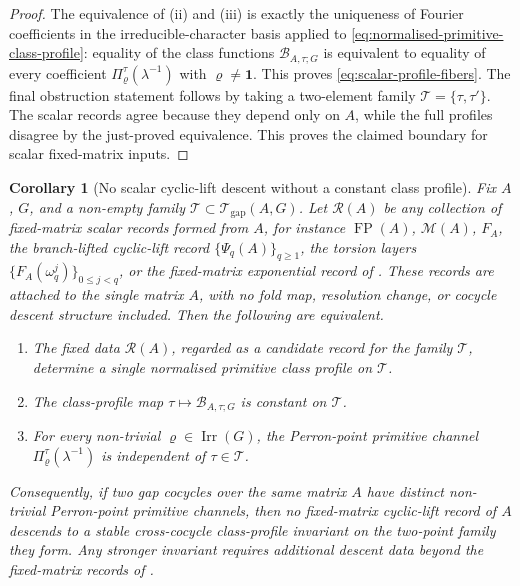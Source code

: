 \documentclass[11pt,a4paper]{amsart}
\theoremstyle{plain}
\newtheorem{corollary}[theorem]{Corollary}
\theoremstyle{definition}
\theoremstyle{remark}
\DeclareMathOperator{\Irr}{Irr}
\DeclareMathOperator{\FP}{FP}
\begin{document}
\begin{proof}
  The equivalence of \textup{(ii)} and \textup{(iii)} is exactly the
  uniqueness of Fourier coefficients in the irreducible-character basis
  applied to
  \eqref{eq:normalised-primitive-class-profile}: equality of the class
  functions \(\mathcal B_{A,\tau;G}\) is equivalent to equality of every
  coefficient \(\Pi_\varrho^\tau(\lambda^{-1})\) with
  \(\varrho\neq\mathbf 1\). This proves
  \eqref{eq:scalar-profile-fibers}. The final obstruction statement follows by
  taking a two-element family \(\mathscr T=\{\tau,\tau'\}\). The scalar
  records agree because they depend only on \(A\), while the full
  profiles disagree by the just-proved equivalence. This proves the
  claimed boundary for scalar fixed-matrix inputs.
\end{proof}

\begin{corollary}[No scalar cyclic-lift descent without a constant
  class profile]
  \label{cor:fixed-matrix-record-no-descent}
  Fix \(A\), \(G\), and a non-empty family
  \(\mathscr T\subset\mathcal T_{\mathrm{gap}}(A,G)\). Let
  \(\mathcal R(A)\) be any collection of fixed-matrix scalar records formed
  from \(A\), for instance
  \(\FP(A)\), \(\mathcal M(A)\), \(F_A\), the branch-lifted cyclic-lift
  record \(\{\Psi_q(A)\}_{q\ge1}\), the torsion layers
  \(\{F_A(\omega_q^j)\}_{0\le j<q}\), or the fixed-matrix exponential
  record of . These records are attached
  to the single matrix \(A\), with no fold map, resolution change, or
  cocycle descent structure included. Then the following are
  equivalent.
  \begin{enumerate}[label=\textup{(\roman*)}]
    \item The fixed data \(\mathcal R(A)\), regarded as a candidate record
      for the family \(\mathscr T\), determine a single normalised
      primitive class profile on \(\mathscr T\).
    \item The class-profile map
      \(\tau\mapsto\mathcal B_{A,\tau;G}\) is constant on
      \(\mathscr T\).
    \item For every non-trivial \(\varrho\in\Irr(G)\), the Perron-point
      primitive channel
      \(\Pi_\varrho^\tau(\lambda^{-1})\) is independent of
      \(\tau\in\mathscr T\).
  \end{enumerate}
  Consequently, if two gap cocycles over the same matrix \(A\) have
  distinct non-trivial Perron-point primitive channels, then no
  fixed-matrix cyclic-lift record of \(A\) descends to a stable
  cross-cocycle class-profile invariant on the two-point family they
  form. Any stronger invariant requires additional descent data beyond
  the fixed-matrix records of .
\end{corollary}
\end{document}
